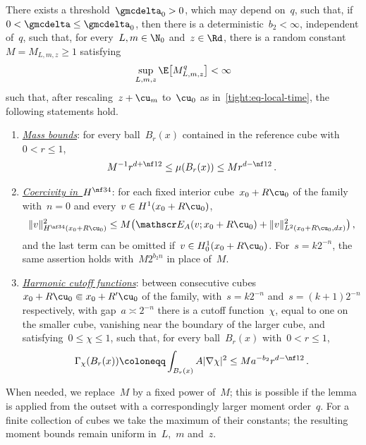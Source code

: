 \documentclass[11pt]{amsart}
\begin{document}
\begin{lemma}
\label{tight:lem-static}
There exists a threshold~$\gmcdelta_0>0$, which may depend on~$q$, such that, if~$0<\gmcdelta\leq\gmcdelta_0$, then there is a deterministic~$b_2<\infty$, independent of~$q$, such that, for every~$L,m\in\N_0$ and~$z\in\Rd$, there is a random constant~$M=M_{L,m,z}\geq1$ satisfying
\begin{equation*}
	\sup_{L,m,z}\E\bigl[M_{L,m,z}^q\bigr]<\infty
\end{equation*}
such that, after rescaling~$z+\cu_m$ to~$\cu_0$ as in~\eqref{tight:eq-local-time}, the following statements hold.
\begin{enumerate}[label=(\roman*)]
\item \underline{\emph{Mass bounds}}: for every ball~$B_r(x)$ contained in the reference cube with~$0<r\leq1$,
\begin{equation}
	M^{-1}r^{d+\nf12}\leq\mu(B_r(x))\leq Mr^{d-\nf12}\,.
	\label{tight:eq-mass}
\end{equation}

\item \underline{\emph{Coercivity in~$H^{\nf34}$}}: for each fixed interior cube~$x_0+R\cu_0$ of the family with~$n=0$ and every~$v\in H^1(x_0+R\cu_0)$,
\begin{equation}
	\|v\|_{H^{\nf34}(x_0+R\cu_0)}^2
	\leq M\bigl(\mathscr E_A(v;x_0+R\cu_0)+\|v\|_{L^2(x_0+R\cu_0,dx)}^2\bigr)\,,
	\label{tight:eq-coercivity}
\end{equation}
and the last term can be omitted if~$v\in H_0^1(x_0+R\cu_0)$. For~$s=k2^{-n}$, the same assertion holds with~$M2^{b_2n}$ in place of~$M$.

\item \underline{\emph{Harmonic cutoff functions}}: between consecutive cubes~$x_0+R\cu_0\Subset x_0+R'\cu_0$ of the family, with~$s=k2^{-n}$ and~$s=(k+1)2^{-n}$ respectively, with gap~$a\asymp2^{-n}$ there is a cutoff function~$\chi$, equal to one on the smaller cube, vanishing near the boundary of the larger cube, and satisfying~$0\leq\chi\leq1$, such that, for every ball~$B_r(x)$ with~$0<r\leq1$,
\begin{equation}
	\Gamma_\chi(B_r(x))
	\coloneqq\int_{B_r(x)}A|\nabla\chi|^2
	\leq Ma^{-b_2}r^{d-\nf12}\,.
	\label{tight:eq-cutoff-measure}
\end{equation}
\end{enumerate}
\end{lemma}

When needed, we replace~$M$ by a fixed power of~$M$; this is possible if the lemma is applied from the outset with a correspondingly larger moment order~$q$. For a finite collection of cubes we take the maximum of their constants; the resulting moment bounds remain uniform in~$L$,~$m$ and~$z$.
\end{document}
